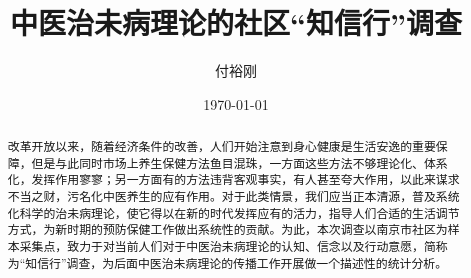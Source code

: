 \documentclass{ctexart}
\title{中医治未病理论的社区“知信行”调查}
\author{付裕刚}
\date{\today}
\begin{document}
	\maketitle
	\begin{abstract}
	改革开放以来，随着经济条件的改善，人们开始注意到身心健康是生活安逸的重要保障，但是与此同时市场上养生保健方法鱼目混珠，一方面这些方法不够理论化、体系化，发挥作用寥寥；另一方面有的方法违背客观事实，有人甚至夸大作用，以此来谋求不当之财，污名化中医养生的应有作用。对于此类情景，我们应当正本清源，普及系统化科学的治未病理论，使它得以在新的时代发挥应有的活力，指导人们合适的生活调节方式，为新时期的预防保健工作做出系统性的贡献。为此，本次调查以南京市社区为样本采集点，致力于对当前人们对于中医治未病理论的认知、信念以及行动意愿，简称为“知信行”调查，为后面中医治未病理论的传播工作开展做一个描述性的统计分析。
	\end{abstract}
\tableofcontents





\printbibliography

\end{document}
